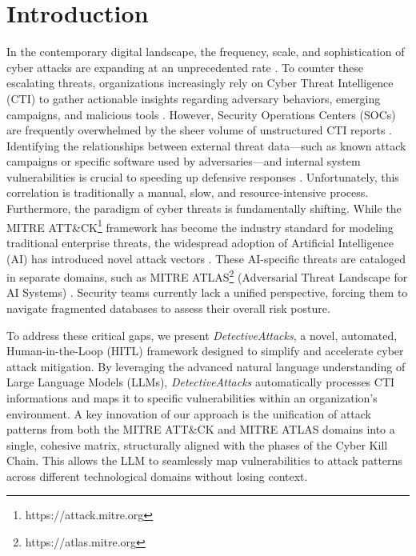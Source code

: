 \documentclass[conference]{IEEEtran}
\begin{document}
\section{Introduction}
In the contemporary digital landscape, the frequency, scale, and sophistication of cyber attacks are expanding at an unprecedented rate \cite{Adekoya_2025}. To counter these escalating threats, organizations increasingly rely on Cyber Threat Intelligence (CTI) to gather actionable insights regarding adversary behaviors, emerging campaigns, and malicious tools \cite{PRASAD2025104606}. However, Security Operations Centers (SOCs) are frequently overwhelmed by the sheer volume of unstructured CTI reports \cite{Baldassarre2019_HackSpace}. Identifying the relationships between external threat data—such as known attack campaigns or specific software used by adversaries—and internal system vulnerabilities is crucial to speeding up defensive responses \cite{Aslan_2023}. Unfortunately, this correlation is traditionally a manual, slow, and resource-intensive process.
Furthermore, the paradigm of cyber threats is fundamentally shifting. While the MITRE ATT\&CK\footnote{https://attack.mitre.org} framework has become the industry standard for modeling traditional enterprise threats, the widespread adoption of Artificial Intelligence (AI) has introduced novel attack vectors \cite{Alsada_MITRE-ATT_2024,Alsada_MITRE-ATT_2025}. These AI-specific threats are cataloged in separate domains, such as MITRE ATLAS\footnote{https://atlas.mitre.org} (Adversarial Threat Landscape for AI Systems) \cite{carroll2025strengthening_MitreATLAS}. Security teams currently lack a unified perspective, forcing them to navigate fragmented databases to assess their overall risk posture. 

To address these critical gaps, we present \textit{DetectiveAttacks}, a novel, automated, Human-in-the-Loop (HITL) framework designed to simplify and accelerate cyber attack mitigation. By leveraging the advanced natural language understanding of Large Language Models (LLMs), \textit{DetectiveAttacks} automatically processes CTI informations and maps it to specific vulnerabilities within an organization's environment. A key innovation of our approach is the unification of attack patterns from both the MITRE ATT\&CK and MITRE ATLAS domains into a single, cohesive matrix, structurally aligned with the phases of the Cyber Kill Chain. This allows the LLM to seamlessly map vulnerabilities to attack patterns across different technological domains without losing context.
\end{document}
